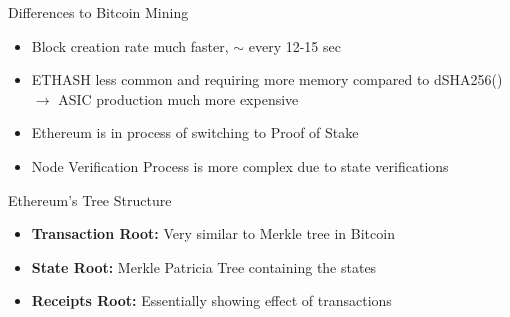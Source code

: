 \documentclass[]{beamer}
\begin{document}
\begin{frame}{Differences to Bitcoin Mining}

\begin{itemize}
	\item<1-> Block creation rate much faster, $\sim$ every 12-15 sec
	\item<2-> ETHASH less common and requiring more memory compared to dSHA256() $\rightarrow$  ASIC production much more expensive
			\item<3-> Ethereum is in process of switching to Proof of Stake
			\item<4-> Node Verification Process is more complex due to state verifications
		\end{itemize}


		
\end{frame}

\begin{frame}{Ethereum’s Tree Structure}
\vspace{1em}
\vspace{1em}
\begin{itemize}
	\item<2-> \textbf{Transaction Root:} Very similar to Merkle tree in Bitcoin
	\item<3-> \textbf{State Root:} Merkle Patricia Tree containing the states
	\item<4-> \textbf{Receipts Root:} Essentially showing effect of transactions
\end{itemize}

\end{frame}
\end{document}
